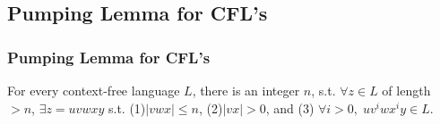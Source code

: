 \subsection{\color{ForestGreen}Pumping Lemma for CFL's}

\subsubsection{Pumping Lemma for CFL's}
For every context-free language $L$, there is an integer $n$, s.t. $\forall z\in L$ of length $>n$,  $\exists z = uvwxy$ s.t. (1)$|vwx| \leq n$, (2)$|vx| > 0$, and (3) $\forall i >0, \; uv^iwx^iy \in L.$

